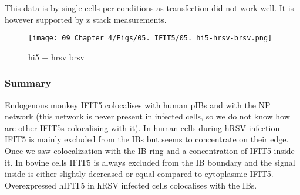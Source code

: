 This data is by single cells per conditions as transfection did not work well. It is however supported by z stack measurements.


\begin{figure}
    \centering
    \texttt{[image: 09 Chapter 4/Figs/05. IFIT5/05. hi5-hrsv-brsv.png]}
    \caption[hi5 + hrsv brsv]{hi5 + hrsv brsv}
    \label{fig:hi5 + hrsv brsv}
\end{figure}

\subsubsection{Summary} \label{Summary-i5}
Endogenous monkey IFIT5 colocalises with human pIBs and with the NP network (this network is never present in infected cells, so we do not know how are other IFIT5s colocalising with it). In human cells during hRSV infection IFIT5 is mainly excluded from the IBs but seems to concentrate on their edge. Once we saw colocalization with the IB ring and a concentration of IFIT5 inside it. In bovine cells IFIT5 is always excluded from the IB boundary and the signal inside is either slightly decreased or equal compared to cytoplasmic IFIT5. Overexpressed hIFIT5 in hRSV infected cells colocalises with the IBs.